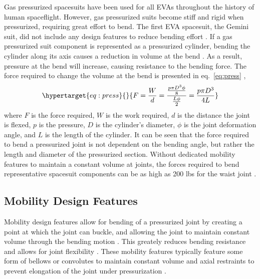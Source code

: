 \documentclass[defaultstyle,11pt]{thesis}
\begin{document}
Gas pressurized spacesuits have been used for all EVAs throughout the history of human spaceflight.
However, gas pressurized suits become stiff and rigid when pressurized, requiring great effort to bend.
The first EVA spacesuit, the Gemini suit, did not include any design features to reduce bending effort \citep{Thomas2012}.
If a gas pressurized suit component is represented as a pressurized cylinder, bending the cylinder along its axis causes a reduction in volume at the bend \citep{Harris2001}.
As a result, pressure at the bend will increase, causing resistance to the bending force.
The force required to change the volume at the bend is presented in eq.~\ref{eq:press} \citep{Newman1997, Harris2001},
\begin{equation}\protect\hypertarget{eq:press}{}{
F = \frac{W}{d} = \frac{\frac{p\pi D^{3}\phi}{8}}{\frac{L\phi}{2}} = \frac{p\pi D^{3}}{4L}
}\label{eq:press}\end{equation}
where \(F\) is the force required, \(W\) is the work required, \(d\) is the distance the joint is flexed, \(p\) is the pressure, \(D\) is the cylinder's diameter, \(\phi\) is the joint deformation angle, and \(L\) is the length of the cylinder.
It can be seen that the force required to bend a pressurized joint is not dependent on the bending angle, but rather the length and diameter of the pressurized section.
Without dedicated mobility features to maintain a constant volume at joints, the forces required to bend representative spacesuit components can be as high as 200 lbs for the waist joint \citep{Newman1997}.

\hypertarget{mobility-design-features}{%
\subsection{Mobility Design Features}\label{mobility-design-features}}

Mobility design features allow for bending of a pressurized joint by creating a point at which the joint can buckle, and allowing the joint to maintain constant volume through the bending motion \citep{Harris2001}.
This greately reduces bending resistance and allows for joint flexibility \citep{Harris2001}.
These mobility features typically feature some form of bellows or convolutes to maintain constant volume and axial restraints to prevent elongation of the joint under pressurization \citep{Harris2001}.
\end{document}

